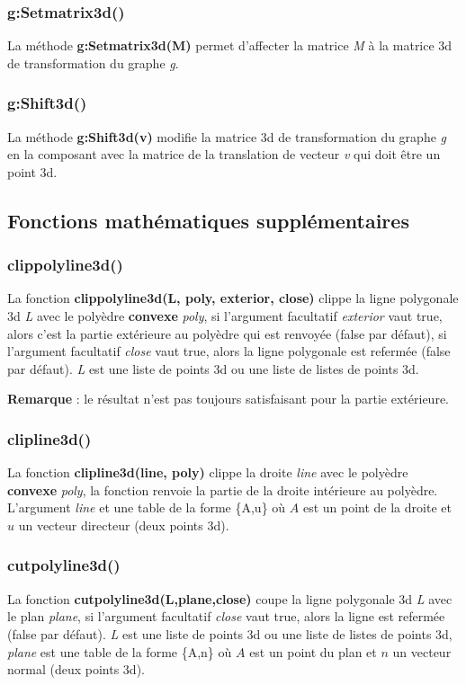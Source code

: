 \subsubsection{g:Setmatrix3d()}
La méthode \textbf{g:Setmatrix3d(M)} permet d'affecter la matrice \emph M à la matrice 3d de transformation du graphe \emph g.

\subsubsection{g:Shift3d()}
La méthode \textbf{g:Shift3d(v)} modifie la matrice 3d de transformation du graphe \emph g en la composant avec la matrice de la translation de vecteur \emph{v} qui doit être un point 3d.

\subsection{Fonctions mathématiques supplémentaires}

\subsubsection{clippolyline3d()}
La fonction \textbf{clippolyline3d(L, poly, exterior, close)} clippe la ligne polygonale 3d \emph{L} avec le polyèdre \textbf{convexe} \emph{poly}, si l'argument facultatif \emph{exterior} vaut true, alors c'est la partie extérieure au polyèdre qui est renvoyée (false par défaut), si l'argument facultatif \emph{close} vaut true, alors la ligne polygonale est refermée (false par défaut). \emph{L} est une liste de points 3d ou une liste de listes de points 3d.\par
\textbf{Remarque} : le résultat n'est pas toujours satisfaisant pour la partie extérieure.

\subsubsection{clipline3d()}
La fonction \textbf{clipline3d(line, poly)} clippe la droite \emph{line} avec le polyèdre \textbf{convexe} \emph{poly}, la fonction renvoie la partie de la droite intérieure au polyèdre. L'argument \emph{line} et une table de la forme \{A,u\} où $A$ est un point de la droite et $u$ un vecteur directeur (deux points 3d).

\subsubsection{cutpolyline3d()}
La fonction \textbf{cutpolyline3d(L,plane,close)} coupe la ligne polygonale 3d \emph{L} avec le plan \emph{plane}, si l'argument facultatif \emph{close} vaut true, alors la ligne est refermée (false par défaut).
\emph{L} est une liste de points 3d ou une liste de listes de points 3d, \emph{plane} est une table de la forme \{A,n\} où $A$ est un point du plan et $n$ un vecteur normal (deux points 3d).

